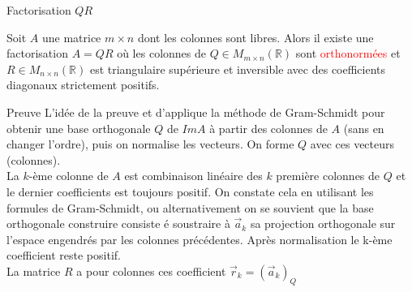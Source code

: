 \begin{parag}{Factorisation $QR$}
    \begin{definition}
        Soit $A$ une matrice $m \times n$ dont les colonnes sont libres. Alors il existe une factorisation $A = QR$ où les colonnes de $Q \in M_{m\times n}(\mathbb{R})$ sont \textcolor{red}{orthonormées} et $R\in M_{n\times n}(\mathbb{R})$ est triangulaire supérieure et inversible avec des coefficients diagonaux strictement positifs.
    \end{definition}
    \begin{subparag}{Preuve}
        L'idée de la preuve et d'applique la méthode de Gram-Schmidt pour obtenir une base orthogonale $Q$ de $ImA$ à partir des colonnes de $A$ (sans en changer l'ordre), puis on normalise les vecteurs. On forme $Q$ avec ces vecteurs (colonnes).
        \\
        La $k$-ème colonne de $A$ est combinaison linéaire des $k$ première colonnes de $Q$ et le dernier coefficients est toujours positif. On constate cela en utilisant les formules de Gram-Schmidt, ou alternativement on se souvient que la base orthogonale construire consiste é soustraire à $\vec{a}_k$ sa projection orthogonale sur l'espace engendrés par les colonnes précédentes. Après normalisation le k-ème coefficient reste positif.
        \\
        La matrice $R$  a pour colonnes ces coefficient $\vec{r}_k = (\vec{a}_k)_Q$
    \end{subparag}


\end{parag}
